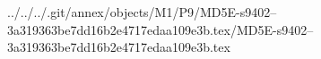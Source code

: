 ../../../.git/annex/objects/M1/P9/MD5E-s9402--3a319363be7dd16b2e4717edaa109e3b.tex/MD5E-s9402--3a319363be7dd16b2e4717edaa109e3b.tex